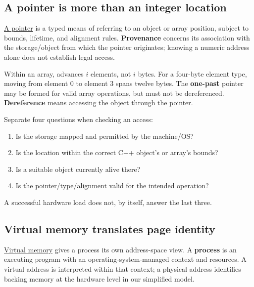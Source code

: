 \subsection{A pointer is more than an integer location}\label{01-foundations-i-ch002-a-pointer-is-more-than-an-integer-location}

\hypertarget{01-foundations-i-ch002-a-pointer-is-more-than-an-integer-location}{}

\hyperref[appendix-6af5921bc853]{A pointer} is a typed means of referring to an object or array position, subject to bounds, lifetime, and alignment rules. \textbf{Provenance} concerns its association with the storage/object from which the pointer originates; knowing a numeric address alone does not establish legal access.

Within an array,  advances \(i\) elements, not \(i\) bytes. For a four-byte element type, moving from element 0 to element 3 spans twelve bytes. The \textbf{one-past} pointer may be formed for valid array operations, but must not be dereferenced. \textbf{Dereference} means accessing the object through the pointer.

Separate four questions when checking an access:

\begin{enumerate}
\def\labelenumi{\arabic{enumi}.}
\tightlist
\item
  Is the storage mapped and permitted by the machine/OS?
\item
  Is the location within the correct C++ object's or array's bounds?
\item
  Is a suitable object currently alive there?
\item
  Is the pointer/type/alignment valid for the intended operation?
\end{enumerate}

A successful hardware load does not, by itself, answer the last three.

\subsection{Virtual memory translates page identity}\label{01-foundations-i-ch002-virtual-memory-translates-page-identity}

\hypertarget{01-foundations-i-ch002-virtual-memory-translates-page-identity}{}

\hyperref[appendix-18ee4f913c3c]{Virtual memory} gives a process its own address-space view. A \textbf{process} is an executing program with an operating-system-managed context and resources. A virtual address is interpreted within that context; a physical address identifies backing memory at the hardware level in our simplified model.


